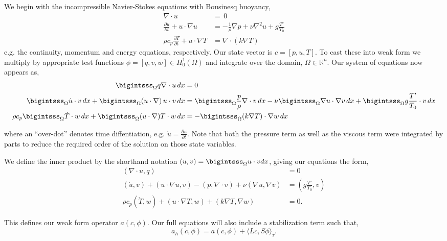 \documentclass{article}
\begin{document}
We begin with the incompressible Navier-Stokes equations with Bousinesq
buoyancy,
\begin{align}
 \nabla \cdot u &= \, 0 \label{eq_cont}\\
 \frac{\partial u}{\partial t} + u \cdot \nabla u &= -\frac{1}{\rho}
 \nabla p + \nu \nabla^2 u + g \frac{T'}{T_0} \label{eq_mom}\\
 \rho c_p \frac{\partial T}{\partial t} + u \cdot \nabla T &= \nabla
 \cdot (k \nabla T) \label{eq_energy}
\end{align}
e.g. the continuity, momentum and energy equations, respectively. Our 
state vector is $c =  \left[p,u,T \right]$. To cast these into
weak form we multiply by appropriate test 
functions $\phi = \left[q,v,w \right] \in H^1_0(\Omega)$ and integrate over
the domain, $\Omega \in \mathbb{R}^n$. Our system of equations now
appears as, 
\begin{align}
  \bigintsss_\Omega q \nabla \cdot u \, dx &= 0 \\
 \bigintsss_\Omega \dot u \cdot v \, dx +
 \bigintsss_\Omega  (u \cdot \nabla) \, u \cdot v \, dx &=
 \bigintsss_\Omega \frac{p}{\rho} \nabla \cdot v \, dx - \nu \bigintsss_\Omega \nabla u \cdot \nabla v
 \,dx + \bigintsss_\Omega g \frac{T'}{T_0} \cdot v \, dx \\ 
 \rho c_p \bigintsss_\Omega \dot T \cdot w \, dx + \bigintsss_\Omega (u
 \cdot \nabla) T \cdot w \, dx  &= -\bigintsss_\Omega (k \nabla T) \cdot
 \nabla w \, dx
\end{align}

where an ``over-dot'' denotes time diffentiation, e.g. $\dot u =
\frac{\partial u}{\partial t}$. Note that both the pressure term as well
as the viscous term were integrated by parts to reduce the required
order of the solution on those state variables.  

We define the inner product by the shorthand notation $(u,v) =
\bigintsss_\Omega u\cdot v dx $, giving our equations the form,  
\begin{align}
 (\nabla \cdot u, q) &= 0 \\
 (\dot u,v) + (u \cdot \nabla u, v) - (p,\nabla \cdot v) + \nu (\nabla
 u, \nabla v) &= (g \frac{T'}{T_0},v) \\
 \rho c_p (\dot T,w) + (u \cdot \nabla T,w) + (k \nabla T,\nabla w) &= 0.
\end{align}

This defines our weak form operator $a(c,\phi)$. Our full equations will
also include a stabilization term such that,  
\begin{equation}
 a_h(c,\phi) = a(c,\phi) +  \langle Lc,S\phi \rangle_\tau. 
\end{equation}
\end{document}
